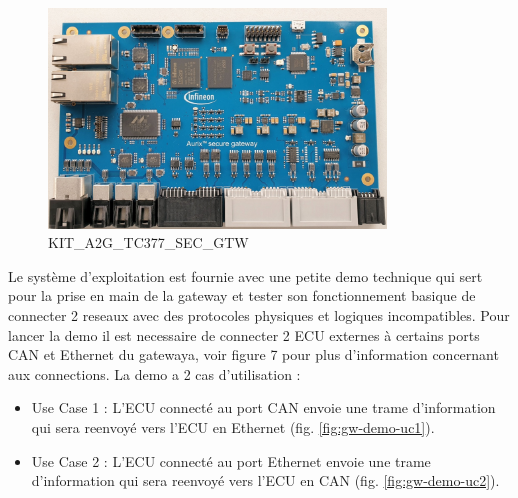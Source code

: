 \begin{figure}[!htb]
 \centering
 \includegraphics[width=0.8\textwidth]{img/secure-gateway.jpg}
 \caption{KIT\_A2G\_TC377\_SEC\_GTW}
 \label{fig:gw-photo}
\end{figure}

Le syst\`eme d'exploitation est fournie avec une petite demo technique qui sert pour la prise en main de la gateway et tester son fonctionnement basique de connecter 2 reseaux avec des protocoles physiques et logiques incompatibles. Pour lancer la demo il est necessaire de connecter 2 ECU externes \`a certains ports CAN et Ethernet du gatewaya, voir figure 7 pour plus d'information concernant aux connections. La demo a 2 cas d'utilisation :


\begin{itemize}
    \item Use Case 1 : L'ECU connect\'e au port CAN envoie une trame d'information qui sera reenvoy\'e vers l'ECU en Ethernet (fig. \ref{fig:gw-demo-uc1}).%
    \item Use Case 2 : L'ECU connect\'e au port Ethernet envoie une trame d'information qui sera reenvoy\'e vers l'ECU en CAN (fig. \ref{fig:gw-demo-uc2}).%
\end{itemize}

